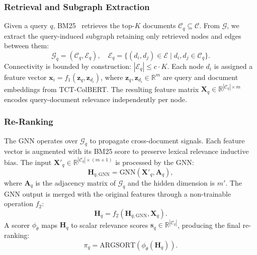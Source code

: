 \documentclass[runningheads]{llncs}
\begin{document}
\subsubsection*{\textbf{Retrieval and Subgraph Extraction}}
Given a query $q$, BM25~\cite{bm25} retrieves the top-$K$ documents $\mathcal{C}_q \subseteq \mathcal{C}$. From $\mathcal{G}$, we extract the query-induced subgraph retaining only retrieved nodes and edges between them:
\begin{equation} \label{eq:subgraph}
    \mathcal{G}_{q} = (\mathcal{C}_q, \mathcal{E}_q), \quad \mathcal{E}_q = \{(d_i,d_j) \in \mathcal{E} \;|\; d_i,d_j \in \mathcal{C}_q\}.
\end{equation}
Connectivity is bounded by construction: $|\mathcal{E}_q| \leq c \cdot K$. Each node $d_i$ is assigned a feature vector $\mathbf{x}_i = f_1(\mathbf{z}_{q}, \mathbf{z}_{d_i})$, where $\mathbf{z}_{q}, \mathbf{z}_{d_i} \in \mathbb{R}^m$ are query and document embeddings from TCT-ColBERT. The resulting feature matrix $\mathbf{X}_q \in \mathbb{R}^{|\mathcal{C}_q| \times m}$ encodes query-document relevance independently per node.

\subsubsection*{\textbf{Re-Ranking}}
The GNN operates over $\mathcal{G}_q$ to propagate cross-document signals. Each feature vector is augmented with its BM25 score to preserve lexical relevance inductive bias. The input $\mathbf{X'}_q \in \mathbb{R}^{|\mathcal{C}_q| \times (m+1)}$ is processed by the GNN:
\begin{equation}
\label{eq:local_interactions}
    \mathbf{H}_{q,\text{GNN}} = \text{GNN}(\mathbf{X'}_q, \mathbf{A}_q),
\end{equation}
where $\mathbf{A}_q$ is the adjacency matrix of $\mathcal{G}_q$ and the hidden dimension is $m'$. The GNN output is merged with the original features through a non-trainable operation $f_2$:
\begin{equation}
    \mathbf{H}_q = f_2\left(\mathbf{H}_{q,\text{GNN}}, \mathbf{X}_q\right).
\end{equation}
A scorer $\phi_{\theta}$ maps $\mathbf{H}_q$ to scalar relevance scores $\mathbf{s}_q \in \mathbb{R}^{|\mathcal{C}_q|}$, producing the final re-ranking:
\begin{equation}
    \pi_q = \text{ARGSORT}(\phi_{\theta}(\mathbf{H}_q)).
\end{equation}
\end{document}

